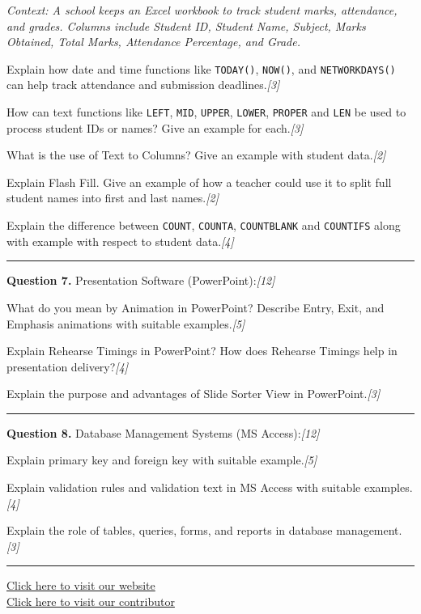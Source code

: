 \documentclass[11pt,a4paper]{article}
\newcommand{\pts}[1]{\hfill   \textit{[#1]}}
\begin{document}
\noindent   \textit{Context: A school keeps an Excel workbook to track student marks, attendance, and grades. Columns include Student ID, Student Name, Subject, Marks Obtained, Total Marks, Attendance Percentage, and Grade.}

\begin{parts}
  \item Explain how date and time functions like   \texttt{TODAY()},   \texttt{NOW()}, and   \texttt{NETWORKDAYS()} can help track attendance and submission deadlines.\pts{3}
  \item How can text functions like   \texttt{LEFT},   \texttt{MID},   \texttt{UPPER},   \texttt{LOWER},   \texttt{PROPER} and   \texttt{LEN} be used to process student IDs or names? Give an example for each.\pts{3}
  \item What is the use of Text to Columns? Give an example with student data.\pts{2}
  \item Explain Flash Fill. Give an example of how a teacher could use it to split full student names into first and last names.\pts{2}
  \item Explain the difference between   \texttt{COUNT},   \texttt{COUNTA},   \texttt{COUNTBLANK} and   \texttt{COUNTIFS} along with example with respect to student data.\pts{4}
\end{parts}

\medskip\rule{\linewidth}{0.2pt}




\noindent   \textbf{Question 7.} Presentation Software (PowerPoint):\pts{12}

\begin{parts}
  \item What do you mean by Animation in PowerPoint? Describe Entry, Exit, and Emphasis animations with suitable examples.\pts{5}
  \item Explain Rehearse Timings in PowerPoint? How does Rehearse Timings help in presentation delivery?\pts{4}
  \item Explain the purpose and advantages of Slide Sorter View in PowerPoint.\pts{3}
\end{parts}

\medskip\rule{\linewidth}{0.2pt}




\noindent   \textbf{Question 8.} Database Management Systems (MS Access):\pts{12}

\begin{parts}
  \item Explain primary key and foreign key with suitable example.\pts{5}
  \item Explain validation rules and validation text in MS Access with suitable examples.\pts{4}
  \item Explain the role of tables, queries, forms, and reports in database management.\pts{3}
\end{parts}

\vfill
\rule{\linewidth}{0.4pt}

\begin{center}\small
\href{https://bhu-exam.vercel.app/}{Click here to visit our website}\\[4pt]
\href{https://me-aryan.vercel.app/}{Click here to visit our contributor}
\end{center}
\end{document}
